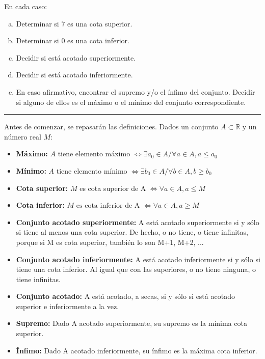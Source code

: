 \documentclass{article}
\begin{document}
En cada caso:

\begin{enumerate}[(a)]

\bfseries

\item Determinar si 7 es una cota superior.

\item Determinar si 0 es una cota inferior.

\item Decidir si está acotado superiormente.

\item Decidir si está acotado inferiormente.

\item En caso afirmativo, encontrar el supremo y/o el ínfimo del conjunto. Decidir si alguno de ellos es el máximo o el mínimo del conjunto correspondiente.

\end{enumerate}

\hrule
\vspace{1em}

Antes de comenzar, se repasarán las definiciones. Dados un conjunto $ A \subset \mathbb{R} $ y un número real $ M $:

\begin{itemize}

\item \textbf{Máximo:} $ A $ tiene elemento máximo $ \Leftrightarrow \exists a_0 \in A / \forall a \in A, a \le a_0 $

\item \textbf{Mínimo:} $ A $ tiene elemento mínimo $ \Leftrightarrow \exists b_0 \in A / \forall b \in A, b \ge b_0 $

\item \textbf{Cota superior:} $ M $ es cota superior de A $ \Leftrightarrow \forall a \in A, a \leq M $

\item \textbf{Cota inferior:} $ M \text{ es cota inferior de A } \Leftrightarrow \forall a \in A, a \geq M $

\item \textbf{Conjunto acotado superiormente:} A está acotado superiormente si y sólo si tiene al menos una cota superior. De hecho, o no tiene, o tiene infinitas, porque si M es cota superior, también lo son M+1, M+2, ...

\item \textbf{Conjunto acotado inferiormente:} A está acotado inferiormente si y sólo si tiene una cota inferior. Al igual que con las superiores, o no tiene ninguna, o tiene infinitas.

\item \textbf{Conjunto acotado:} A está acotado, a secas, si y sólo si está acotado superior e inferiormente a la vez.

\item \textbf{Supremo:} Dado A acotado superiormente, su supremo es la mínima cota superior.

\item \textbf{Ínfimo:} Dado A acotado inferiormente, su ínfimo es la máxima cota inferior.

\end{itemize}
\end{document}
